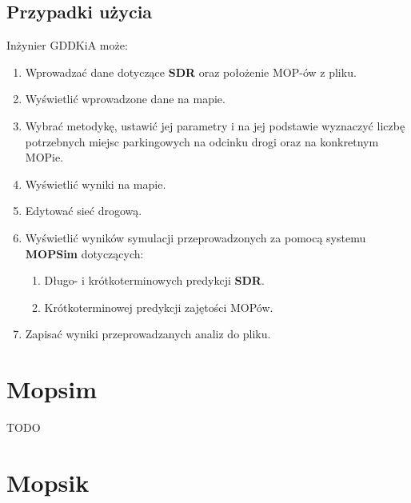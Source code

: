 \section{Przypadki użycia}
Inżynier GDDKiA może:
\begin{enumerate}
  \item Wprowadzać dane dotyczące \textbf{SDR} oraz położenie MOP-ów z pliku.
  \item Wyświetlić wprowadzone dane na mapie.
  \item Wybrać metodykę, ustawić jej parametry i na jej podstawie wyznaczyć
    liczbę potrzebnych miejsc parkingowych na odcinku drogi oraz na konkretnym
    MOPie.
  \item Wyświetlić wyniki na mapie.
  \item Edytować sieć drogową. 
  \item Wyświetlić wyników symulacji przeprowadzonych za pomocą systemu
    \textbf{MOPSim} dotyczących:
    \begin{enumerate}
      \item Długo- i krótkoterminowych predykcji \textbf{SDR}.
      \item Krótkoterminowej predykcji zajętości MOPów.
    \end{enumerate}
  \item Zapisać wyniki przeprowadzanych analiz do pliku.
\end{enumerate}

\chapter{Mopsim}\label{r:mopsim}

TODO

\chapter{Mopsik}\label{r:apka} 


